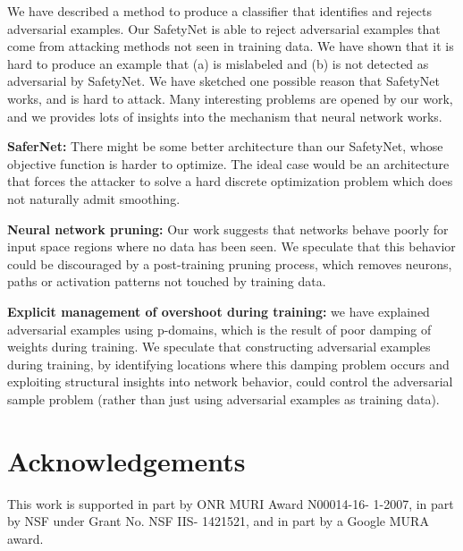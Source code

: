 \documentclass[10pt,twocolumn,letterpaper]{article}
\begin{document}
We have described a method to produce a classifier that identifies and rejects adversarial examples. Our SafetyNet is
able to reject adversarial examples that come from attacking methods not seen in training data. We have shown that it is hard to
produce an example that (a) is mislabeled and (b) is not detected as adversarial by SafetyNet.  We have sketched one
possible reason that SafetyNet works, and is hard to attack. Many interesting problems are opened by our work, and we provides 
lots of insights into the mechanism that neural network works.

\textbf{SaferNet:} There might be some better architecture than our SafetyNet, whose objective function is harder to optimize. 
The ideal case would be an architecture that forces the attacker to solve a hard discrete optimization problem which does 
not naturally admit smoothing. 

\textbf{Neural network pruning: } Our work suggests that networks behave poorly for input space regions
where no data has been seen.  We speculate that this behavior could be discouraged by a post-training pruning process,
which removes neurons, paths or activation patterns not touched by training data. 

\textbf{Explicit management of overshoot during training:} we have explained adversarial examples using p-domains, which
is the result of poor damping of weights during training.  We speculate that constructing
adversarial examples during training, by identifying locations where this damping problem occurs and exploiting structural insights 
into network behavior, could control the adversarial sample problem (rather than just using adversarial examples as training data).


\section{Acknowledgements}
This work is supported in part by ONR MURI Award N00014-16- 1-2007,  in part by NSF under Grant No. NSF IIS- 1421521, and in part by a Google MURA award.

\begin{comment}
By applying small amount of the random noise, we can destroy the pattern of the adversarial perturbations. However, how much amount need to be applied depends on the
network structure and how the adversarial samples are generated. In some cases, little noise works perfect; in some cases, strong noise needs to be added, which will make
the image hard to be recognized for the classifier. So there is a balance between the amount of the noise. We plot the balance curve in Figure ?. In order to make the network handle random noise better, we need to fine-tune the network with noisy input images. Related previous work~\cite{gu2014towards}. We try adding random noise at the first layer of the input features. 
\end{comment}
\end{document}
